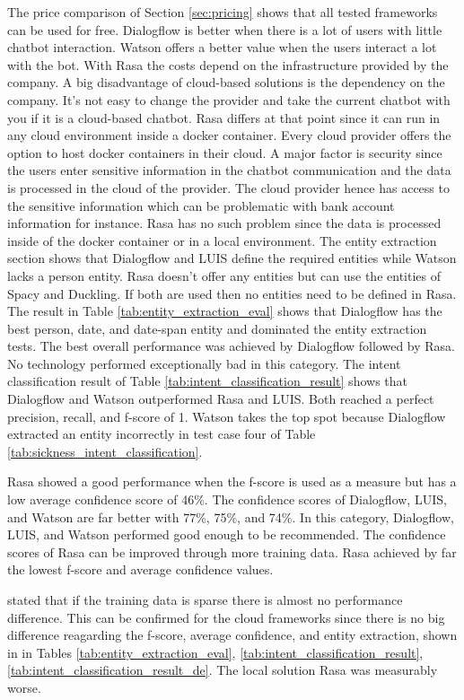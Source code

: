The price comparison of Section \ref{sec:pricing} shows that all 
tested frameworks can be used for free.
Dialogflow is better when there is a lot of users with little chatbot interaction.
Watson offers a better value when the users interact a lot with the bot.
With Rasa the costs depend on the infrastructure provided by the company.
A big disadvantage of cloud-based solutions is the dependency on the company.
It's not easy to change the provider and take the current chatbot with you if it 
is a cloud-based chatbot. 
Rasa differs at that point since it can run in any cloud environment inside a docker container.
Every cloud provider offers the option to host docker containers in their cloud.
A major factor is security since the users enter sensitive information in the chatbot communication
and the data is processed in the cloud of the provider.
The cloud provider hence has access to the sensitive information which can be problematic with
bank account information for instance.
Rasa has no such problem since the data is processed inside of the docker container or in a 
local environment.
The entity extraction section shows that Dialogflow and LUIS 
define the required entities while Watson lacks a person entity.
Rasa doesn't offer any entities but can use the entities of 
Spacy and Duckling.
If both are used then no entities need to be defined in Rasa.
The result in Table \ref{tab:entity_extraction_eval} shows that 
Dialogflow has the best person, date, and date-span entity and dominated the 
entity extraction tests.
The best overall performance was achieved by Dialogflow followed by Rasa.
No technology performed exceptionally bad in this category.
The intent classification result of Table \ref{tab:intent_classification_result}
shows that Dialogflow and Watson outperformed Rasa and LUIS.
Both reached a perfect precision, recall, and f-score of 1.
Watson takes the top spot because Dialogflow extracted an entity incorrectly 
in test case four of Table \ref{tab:sickness_intent_classification}.

Rasa showed a good performance when the f-score is used as a measure but 
has a low average confidence score of 46\%.
The confidence scores of Dialogflow, LUIS, and Watson are far better with 77\%, 75\%, and 74\%.
In this category, Dialogflow, LUIS, and Watson performed good enough to be recommended.
The confidence scores of Rasa can be improved through more training data.
Rasa achieved by far the lowest f-score and average confidence values.

\citet{braunEvaluatingNLU} stated that if the training data is sparse there is almost no performance difference.
This can be confirmed for the cloud frameworks since there is no big difference reagarding the f-score, 
average confidence, and entity extraction, shown in in Tables \ref{tab:entity_extraction_eval}, \ref{tab:intent_classification_result}, \ref{tab:intent_classification_result_de}.
The local solution Rasa was measurably worse.

